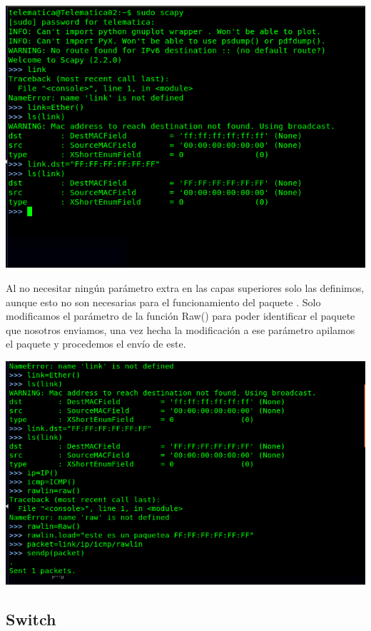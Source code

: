 \documentclass[spanish]{udpreport}
\begin{document}
\begin{center}
	\includegraphics[scale=.37]{imagenes/Switch/Test_1a_b.png}
\end{center}

Al no necesitar ningún parámetro extra en las capas superiores solo las definimos, aunque esto no son necesarias para el funcionamiento del paquete . Solo modificamos el parámetro de la función Raw() para poder identificar el paquete que nosotros enviamos, una vez hecha la modificación a ese parámetro apilamos el paquete y procedemos el envío de este.

\begin{center}
	\includegraphics[scale=.37]{imagenes/Switch/Test_1b.png}
\end{center}

\pagebreak

\subsection{Switch}
\end{document}
